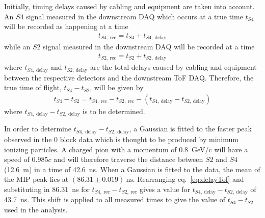 Initially, timing delays caused by cabling and equipment are taken into account.
An $\mathit{S4}$ signal measured in the downstream DAQ which occurs at a true time $t_{\mathit{S4}}$ will be recorded as happening at a time
\begin{align}
  t_{\mathit{S4},~\text{rec}} = t_{\mathit{S4}} + t_{\mathit{S4},~\text{delay}}
  \label{eq:delayS4}
\end{align}
while an $\mathit{S2}$ signal measured in the downstream DAQ will be recorded at a time
\begin{align}
  t_{\mathit{S2},~\text{rec}} = t_{\mathit{S2}} + t_{\mathit{S2},~\text{delay}}
  \label{eq:delayS2}
\end{align}
where $t_{\mathit{S4},~\text{delay}}$ and $t_{\mathit{S2},~\text{delay}}$ are the total delays caused by cabling and equipment between the respective detectors and the downstream ToF DAQ.
Therefore, the true time of flight, $t_{\mathit{S4}} - t_{\mathit{S2}}$, will be given by
\begin{align}
  t_{\mathit{S4}} - t_{\mathit{S2}} = t_{\mathit{S4},~\text{rec}} - t_{\mathit{S2},~\text{rec}} - \left( t_{\mathit{S4},~\text{delay}} - t_{\mathit{S2},~\text{delay}} \right)
  \label{eq:delayTof}
\end{align}
where $t_{\mathit{S4},~\text{delay}} - t_{\mathit{S2},~\text{delay}}$ is to be determined.

In order to determine $t_{\mathit{S4},~\text{delay}} - t_{\mathit{S2},~\text{delay}}$, a Gaussian is fitted to the faster peak observed in the 0 block data which is thought to be produced by minimum ionizing particles.
A charged pion with a momentum of 0.8~GeV/c will have a speed of $0.985c$ and will therefore traverse the distance between $\mathit{S2}$ and $\mathit{S4}$ (12.6~m) in a time of 42.6~ns.
When a Gaussian is fitted to the data, the mean of the MIP peak lies at $(86.31 \pm 0.019)~\text{ns}$.
Rearranging eq.~\ref{eq:delayTof} and substituting in 86.31~ns for $t_{\mathit{S4},~\text{rec}} - t_{\mathit{S2},~\text{rec}}$ gives a value for $t_{\mathit{S4},~\text{delay}} - t_{\mathit{S2},~\text{delay}}$ of 43.7~ns.
This shift is applied to all measured times to give the value of $t_{\mathit{S4}} - t_{\mathit{S2}}$ used in the analysis.


